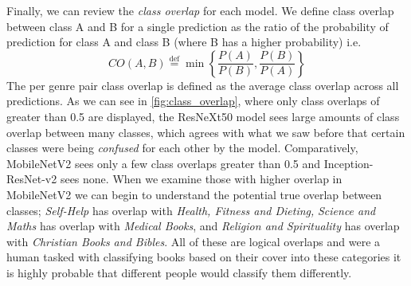 \documentclass[12pt]{article}
\numberwithin{equation}{section}
\numberwithin{figure}{section}
\begin{document}
Finally, we can review the \emph{class overlap} for each model. We define class overlap between class A and B for a single prediction as the ratio of the probability of prediction for class A and class B (where B has a higher probability) i.e.
\begin{equation}
	CO(A, B) \stackrel{\mathrm{def}}{=} \min\left\{\frac{P(A)}{P(B)}, \frac{P(B)}{P(A)}\right\}
\end{equation}
The per genre pair class overlap is defined as the average class overlap across all predictions. As we can see in \cref{fig:class_overlap}, where only class overlaps of greater than 0.5 are displayed, the ResNeXt50 model sees large amounts of class overlap between many classes, which agrees with what we saw before that certain classes were being \emph{confused} for each other by the model. Comparatively, MobileNetV2 sees only a few class overlaps greater than 0.5 and Inception-ResNet-v2 sees none. When we examine those with higher overlap in MobileNetV2 we can begin to understand the potential true overlap between classes; \emph{Self-Help} has overlap with \emph{Health, Fitness and Dieting,} \emph{Science and Maths} has overlap with \emph{Medical Books}, and \emph{Religion and Spirituality} has overlap with \emph{Christian Books and Bibles}. All of these are logical overlaps and were a human tasked with classifying books based on their cover into these categories it is highly probable that different people would classify them differently. 
\end{document}
